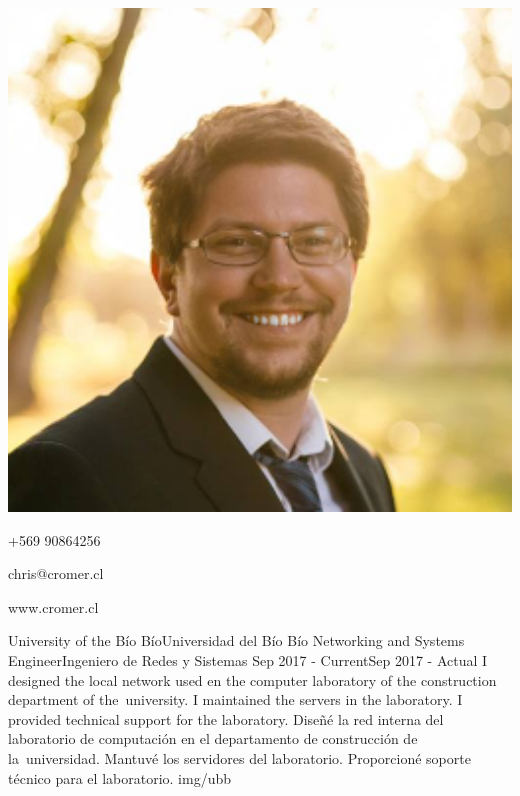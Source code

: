 \documentclass[paper=a4,fontsize=11pt]{includes}
\begin{document}

\begin{minipage}{.2\linewidth}
   \includegraphics[width=1\textwidth]{img/photo}
\end{minipage}
\begin{minipage}{0.7\linewidth}
   \sepspace
   \noindent

   \hfill +569 90864256

   \hfill chris@cromer.cl

   \hfill www.cromer.cl
\end{minipage}


\noindent

\WorkEntry
{University of the Bío Bío}{Universidad del Bío Bío}
{Networking and Systems Engineer}{Ingeniero de Redes y Sistemas}
{Sep 2017 - Current}{Sep 2017 - Actual}
{I designed the local network used en the computer laboratory of the construction department of the\
    university. I maintained the servers in the laboratory. I provided technical support for the
    laboratory.}
{Diseñé la red interna del laboratorio de computación en el departamento de construcción de la\
    universidad. Mantuvé los servidores del laboratorio. Proporcioné soporte técnico para el laboratorio.}
{img/ubb}
\end{document}
